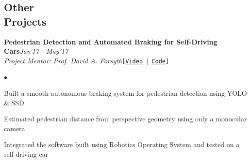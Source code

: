 \documentclass[margin,line]{res}
\newenvironment{list2}{
  \begin{list}{$\bullet$}{%
      \setlength{\itemsep}{0in}
      \setlength{\parsep}{0in} \setlength{\parskip}{0in}
      \setlength{\topsep}{0in} \setlength{\partopsep}{0in} 
      \setlength{\leftmargin}{0.2in}}}{\end{list}}
\begin{document}
\begin{resume}
\section{\sc \large Other \\Projects} 
{\bf Pedestrian Detection and Automated Braking for Self-Driving Cars}{\hfill \em Jan'17 - May'17}\\
{\em Project Mentor: Prof. David A. Forsyth}{\hfill \tt [\href{https://www.youtube.com/watch?v=GqzZzr85BcQ}{Video} %
$|$ \href{https://github.com/tensorpro/MAAV}{Code}]}\vspace{-0.15in}\\
\begin{list2}
\item Built a smooth autonomous braking system for pedestrian detection using YOLO \& SSD
\item Estimated pedestrian distance from perspective geometry using only a monocular camera
\item Integrated the software built using Robotics Operating System and tested on a self-driving car 
\end{list2}


\end{resume}
\end{document}
